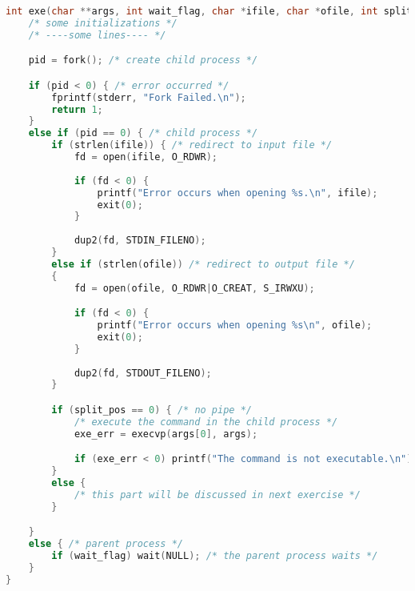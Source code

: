 \documentclass{article}
\begin{document}
\begin{lstlisting}[language=c]
int exe(char **args, int wait_flag, char *ifile, char *ofile, int split_pos) {
    /* some initializations */
    /* ----some lines---- */

    pid = fork(); /* create child process */

    if (pid < 0) { /* error occurred */
        fprintf(stderr, "Fork Failed.\n");
        return 1;
    }
    else if (pid == 0) { /* child process */
        if (strlen(ifile)) { /* redirect to input file */
            fd = open(ifile, O_RDWR);
            
            if (fd < 0) {
                printf("Error occurs when opening %s.\n", ifile);
                exit(0);
            }
            
            dup2(fd, STDIN_FILENO);
        }
        else if (strlen(ofile)) /* redirect to output file */
        {
            fd = open(ofile, O_RDWR|O_CREAT, S_IRWXU);

            if (fd < 0) {
                printf("Error occurs when opening %s\n", ofile);
                exit(0);
            }
            
            dup2(fd, STDOUT_FILENO);
        }

        if (split_pos == 0) { /* no pipe */
            /* execute the command in the child process */
            exe_err = execvp(args[0], args); 

            if (exe_err < 0) printf("The command is not executable.\n");
        }
        else {
            /* this part will be discussed in next exercise */
        }

    }
    else { /* parent process */
        if (wait_flag) wait(NULL); /* the parent process waits */
    }
}
\end{lstlisting}
\end{document}
